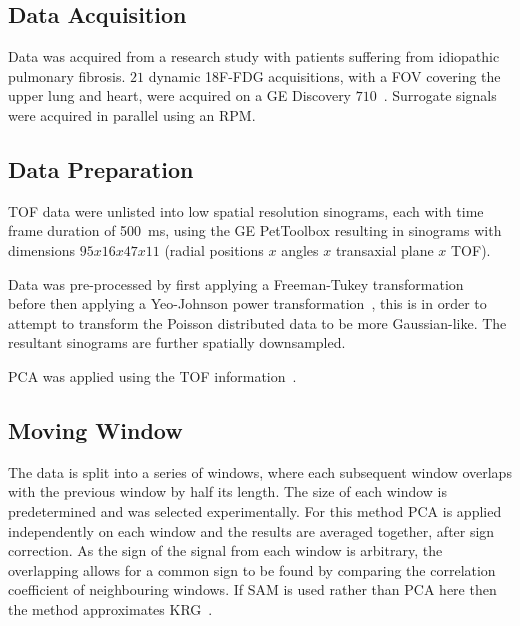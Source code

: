     \subsection{Data Acquisition} \label{sec:data_acquisition}
        Data was acquired from a research study with patients suffering from idiopathic pulmonary fibrosis. $21$ dynamic \gls{18F-FDG} acquisitions, with a \gls{FOV} covering the upper lung and heart, were acquired on a \gls{GE} Discovery $710$~\cite{Oh2019OptimalTreatment, Emond2020EffectReconstruction}. Surrogate signals were acquired in parallel using an \gls{RPM}.
    
        
    \subsection{Data Preparation} \label{sec:data_preparation}
        \gls{TOF} data were unlisted into low spatial resolution sinograms, each with time frame duration of \SI{500}{\milli\second}, using the \gls{GE} PetToolbox resulting in sinograms with dimensions $95 x 16 x 47 x 11$ (radial positions $x$ angles $x$ transaxial plane $x$ \gls{TOF}).
        
        Data was pre-processed by first applying a Freeman-Tukey transformation~\cite{Freeman1950TransformationsRoot} before then applying a Yeo-Johnson power transformation~\cite{Yeo2000ASymmetry}, this is in order to attempt to transform the Poisson distributed data to be more Gaussian-like. The resultant sinograms are further spatially downsampled.
        
        \gls{PCA} was applied using the \gls{TOF} information~\cite{Bertolli2017DataData}.
    
        
    \subsection{Moving Window} \label{sec:moving_window}
        The data is split into a series of windows, where each subsequent window overlaps with the previous window by half its length. The size of each window is predetermined and was selected experimentally. For this method \gls{PCA} is applied independently on each window and the results are averaged together, after sign correction. As the sign of the signal from each window is arbitrary,  the overlapping allows for a common sign to be found by comparing the correlation coefficient of neighbouring windows. If \gls{SAM} is used rather than \gls{PCA} here then the method approximates \gls{KRG}~\cite{Schleyer2014}.
        
